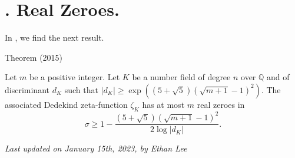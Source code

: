 \section{. Real Zeroes.}


In
\cite{Louboutin*15b},
we find the next result.

\par 
\begin{thm}{Theorem (2015)}

Let $m$ be a positive integer.
  Let $K$ be a number field of degree $n$ over $\mathbb{Q}$ and of
discriminant $d_K$ such that $|d_K|\ge
\exp((5+\sqrt{5})(\sqrt{m+1}-1)^2)$.
The associated Dedekind
zeta-function $\zeta_K$ has at most $m$ real zeroes in
$$
\sigma\ge 1-\frac{(5+\sqrt{5})(\sqrt{m+1}-1)^2}{2\log|d_K|}.
$$
\end{thm}



  
\begin{flushright}\small\sl{}   Last updated on January 15th, 2023, by Ethan Lee
 \end{flushright}














